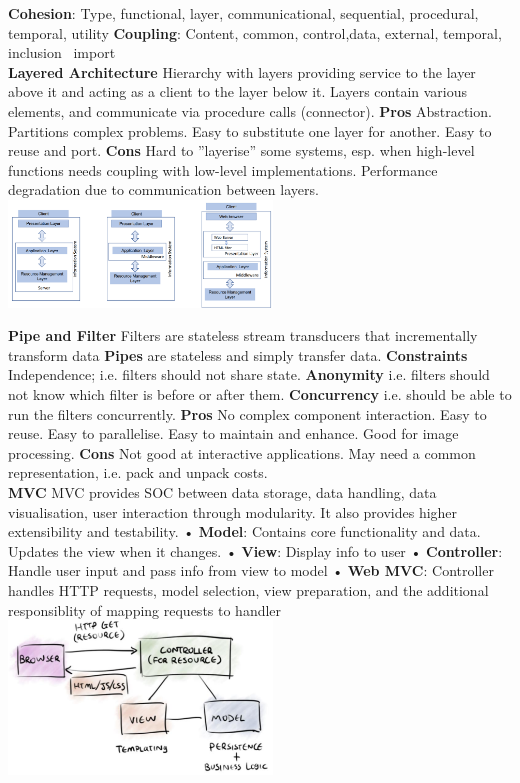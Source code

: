 \documentclass[10pt, landscape]{article}
\begin{document}
\begin{multicols}{4}
\textbf{Cohesion}: Type, functional, layer, communicational, sequential, procedural, temporal, utility \textbf{Coupling}: Content, common, control,data, external, temporal, inclusion \ import \\

\textbf{Layered Architecture} Hierarchy with layers providing service to the layer above it and acting as a client to the layer below it. Layers contain various elements, and communicate via procedure calls (connector). 
\textbf{Pros} Abstraction. Partitions complex problems. Easy to substitute one layer for another. Easy to reuse and port. 
\textbf{Cons} Hard to ”layerise” some systems, esp. when high-level functions needs coupling with low-level implementations. Performance degradation due to communication between layers.\\
\includegraphics*[width=7cm]{layered.png}

\textbf{Pipe and Filter}  Filters are stateless stream transducers that incrementally transform data
\textbf{Pipes} are stateless and simply transfer data. 
\textbf{Constraints} Independence; i.e. filters should not share state.
\textbf{Anonymity} i.e. filters should not know which filter is before or after them. 
\textbf{Concurrency} i.e. should be able to
run the filters concurrently. 
\textbf{Pros} No complex component interaction. Easy to reuse. Easy to parallelise. Easy
to maintain and enhance. Good for image processing.
\textbf{Cons} Not good at interactive applications. May need a common representation,
i.e. pack and unpack costs. \\ 

\textbf{MVC}
MVC provides SOC between data storage, data handling, data visualisation, user interaction through modularity. It also provides higher extensibility and testability.
• \textbf{Model}: Contains core functionality and data. Updates the view when it changes.
• \textbf{View}: Display info to user
• \textbf{Controller}: Handle user input and pass info from view to model
• \textbf{Web MVC}: Controller handles HTTP requests, model selection, view preparation, and the additional responsiblity of mapping requests to handler \\
\includegraphics*[width=7cm]{web_mvc.png}


\end{multicols}
\end{document}
